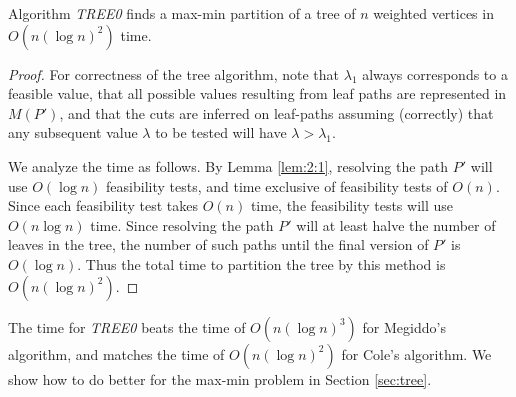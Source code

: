 \begin{theorem}
\label{thm:2:3}
Algorithm {\it TREE0} finds a max-min partition of a tree of $n$
weighted vertices in $O(n (\log n)^2)$ time.
\end{theorem}
\begin{proof}
For correctness of the tree algorithm,
note that $\lambda_1$ always corresponds to a feasible value,
that all possible values resulting from leaf paths
are represented in $M(P')$,
and that the cuts are inferred on leaf-paths assuming (correctly)
that any subsequent value $\lambda$ to be tested
will have $\lambda > \lambda_1$.

We analyze the time as follows.
By Lemma \ref{lem:2:1}, resolving the path $P'$ will
use $O(\log n)$ feasibility tests,
and time exclusive of feasibility tests of $O(n)$.
Since each feasibility test takes $O(n)$ time,
the feasibility tests will use $O(n \log n)$ time.
Since resolving the path $P'$ will at least halve the number of leaves
in the tree, the number of such paths until the final version of $P'$ is $O(\log n)$.
Thus the total time to partition the tree by this method
is $O(n (\log n)^2)$.
\end{proof}

The time for {\it TREE0}
beats the time of $O(n(\log n)^3)$ for Megiddo's algorithm,
and matches the time of $O(n(\log n)^2)$ for Cole's algorithm.
We show how to do better for the max-min problem in Section \ref{sec:tree}.
\bigskip

